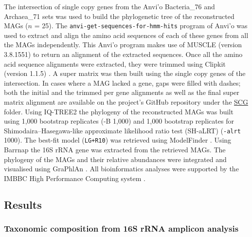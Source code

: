   The intersection of single copy genes from the Anvi’o \citep{eren_anvio_2015} Bacteria\_76 and Archaea\_71 sets was used to build the phylogenetic tree of the reconstructed MAGs ($n$ = 25). 
   The \texttt{anvi-get-sequences-for-hmm-hits} program of Anvi’o was used to extract and align the amino acid sequences of each of these genes from all the MAGs independently. 
   This Anvi’o program makes use of MUSCLE (version 3.8.1551) \citep{edgar_muscle_2004} to return an alignment of the extracted sequences. 
   Once all the amino acid sequence alignments were extracted, they were trimmed using Clipkit (version 1.1.5) \citep{steenwyk_clipkit_2020}. 
   A super matrix was then built using the single copy genes of the intersection. 
   In cases where a MAG lacked a gene, gaps were filled with dashes; both the initial and the trimmed per gene alignments as well as the final super matrix alignment are available on the project’s GitHub repository 
   under the \href{https://github.com/hariszaf/karpathos-swamp/tree/main/phylogeny/SCG/}{SCG} folder. 
   Using IQ-TREE2 \citep{hoang_ufboot2_2018, minh_iq-tree_2020} the phylogeny of the reconstructed MAGs was built using 1,000 bootstrap replicates (-B 1,000) and 1,000 bootstrap replicates for Shimodaira–Hasegawa-like 
   approximate likelihood ratio test (SH-aLRT) (\texttt{-alrt} 1000). 
   The best-fit model (\texttt{LG+R10}) was retrieved using ModelFinder \citep{kalyaanamoorthy_modelfinder_2017}. 
   Using Barrnap \citep{seemann_barrnap_2014} the 16S rRNA gene was extracted from the retrieved MAGs. 
   The phylogeny of the MAGs and their relative abundances were integrated and visualised using GraPhlAn \citep{asnicar_compact_2015}. 
   All bioinformatics analyses were supported by the IMBBC High Performance Computing system \citep{zafeiropoulos_imbbc_2021}.

\subsection{Results}

\subsubsection*{Taxonomic composition from 16S rRNA amplicon analysis}

